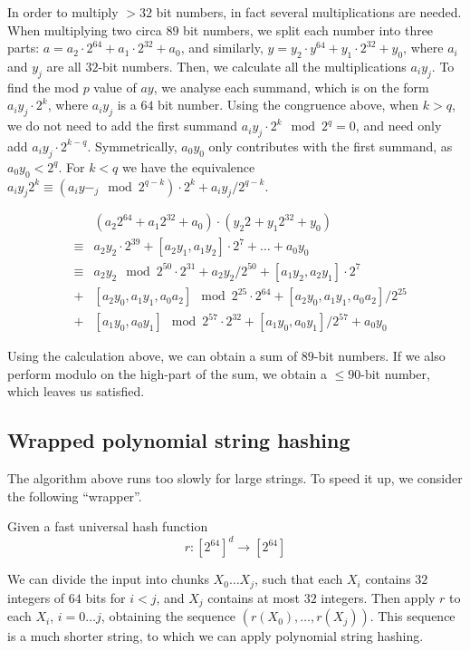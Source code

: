 \documentclass[]{article}
\begin{document}
In order to multiply $>32$ bit numbers, in fact several multiplications are needed. When multiplying two circa $89$ bit numbers, we split each number into three parts: $a = a_2\cdot 2^{64} + a_1 \cdot 2^{32} + a_0$, and similarly, $y = y_2\cdot y^{64} + y_1 \cdot 2^{32} + y_0$, where $a_i$ and $y_j$ are all $32$-bit numbers. Then, we calculate all the multiplications $a_i y_j$. To find the mod $p$ value of $ay$, we analyse each summand, which is on the form $a_i y_j \cdot 2^{k}$, where $a_i y_j$ is a $64$ bit number. Using the congruence above, when $k>q$, we do not need to add the first summand $a_i y_j \cdot 2^k \mod 2^q = 0$, and need only add $a_i y_j \cdot 2^{k-q}$. Symmetrically, $a_0 y_0$ only contributes with the first summand, as $a_0 y_0 < 2^q$. For $k<q$ we have the equivalence $a_i y_j 2^k \equiv (a_i y-_j \mod 2^{q-k})\cdot 2^k + a_i y_j / 2^{q-k}$.

\[\begin{matrix}
& & (a_2 2^{64} + a_1 2^{32} + a_0)\cdot (y_2 2^{} + y_1 2^{32} + y_0) \\
& \equiv & a_2 y_2 \cdot 2^{39} + [a_2 y_1,a_1 y_2] \cdot 2^7 + \ldots + a_0 y_0 \\
& \equiv & a_2 y_2 \mod 2^{50} \cdot 2^{31} + a_2 y_2 / 2^{50} + [a_1 y_2, a_2 y_1] \cdot 2^7 \\
& + & [a_2 y_0, a_1 y_1, a_0 a_2] \mod 2^{25} \cdot 2^{64} + [a_2 y_0, a_1 y_1, a_0 a_2] /2^{25} \\
& + & [a_1 y_0, a_0 y_1] \mod 2^{57} \cdot 2^{32} + [a_1 y_0, a_0 y_1] /2^{57} + a_0 y_0
\end{matrix}
\]

Using the calculation above, we can obtain a sum of $89$-bit numbers. If we also perform modulo on the high-part of the sum, we obtain a $\le 90$-bit number, which leaves us satisfied.

\subsection*{Wrapped polynomial string hashing}

The algorithm above runs too slowly for large strings. To speed it up, we consider the following ``wrapper''.

Given a fast universal hash function
\[r : [2^{64}]^d \to [2^{64}] \]

We can divide the input into chunks $X_0 \ldots X_j$, such that each $X_i$ contains $32$ integers of $64$ bits for $i<j$, and $X_j$ contains at most $32$ integers. Then apply $r$ to each $X_i$, $i=0\ldots j$, obtaining the sequence $\left(r(X_0), \ldots , r(X_j)\right)$. This sequence is a much shorter string, to which we can apply polynomial string hashing.
\end{document}
